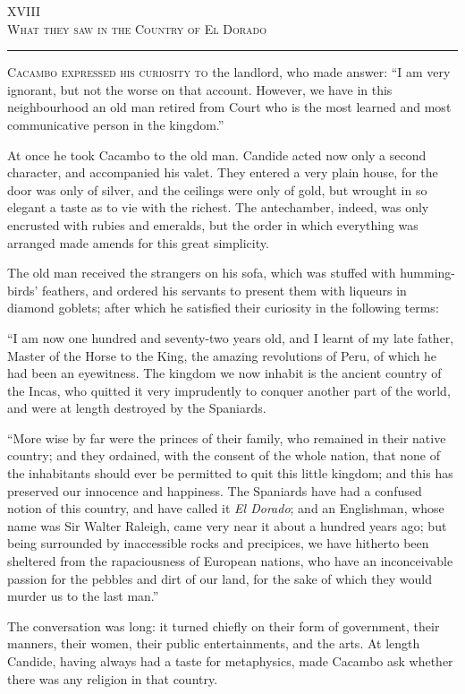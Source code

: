 \begin{center}
XVIII\\
\textsc{What they saw in the Country of El Dorado}
\end{center}
\vspace{-0.5cm}
\rule{\textwidth}{0.5pt}

\lettrine{C}{acambo expressed his curiosity to} the landlord, who made answer:
``I am very ignorant, but not the worse on that account. However, we have in this neighbourhood an old man retired from Court who is the most learned and most communicative person in the kingdom.''

At once he took Cacambo to the old man. Candide acted now only a second character, and accompanied his valet. They entered a very plain house, for the door was only of silver, and the ceilings were only of gold, but wrought in so elegant a taste as to vie with the richest. The antechamber, indeed, was only encrusted with rubies and emeralds, but the order in which everything was arranged made amends for this great simplicity.

The old man received the strangers on his sofa, which was stuffed with humming-birds' feathers, and ordered his servants to present them with liqueurs in diamond goblets; after which he satisfied their curiosity in the following terms:

``I am now one hundred and seventy-two years old, and I learnt of my late father, Master of the Horse to the King, the amazing revolutions of Peru, of which he had been an eyewitness. The kingdom we now inhabit is the ancient country of the Incas, who quitted it very imprudently to conquer another part of the world, and were at length destroyed by the Spaniards.

``More wise by far were the princes of their family, who remained in their native country; and they ordained, with the consent of the whole nation, that none of the inhabitants should ever be permitted to quit this little kingdom; and this has preserved our innocence and happiness. The Spaniards have had a confused notion of this country, and have called it \textit{El Dorado}; and an Englishman, whose name was Sir Walter Raleigh, came very near it about a hundred years ago; but being surrounded by inaccessible rocks and precipices, we have hitherto been sheltered from the rapaciousness of European nations, who have an inconceivable passion for the pebbles and dirt of our land, for the sake of which they would murder us to the last man.''

The conversation was long: it turned chiefly on their form of government, their manners, their women, their public entertainments, and the arts. At length Candide, having always had a taste for metaphysics, made Cacambo ask whether there was any religion in that country.

